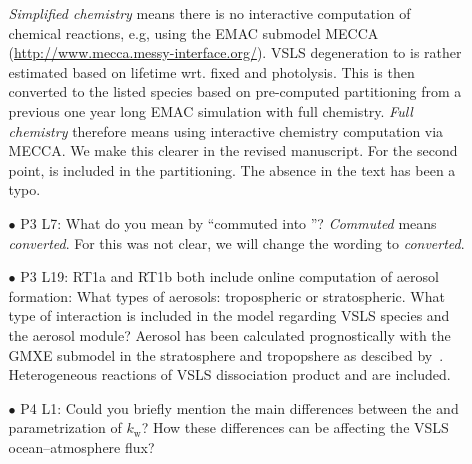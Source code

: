 \begin{itemize}
\begin{itemize}
  \emph{Simplified chemistry} means there is no interactive computation of chemical reactions, e.g, using the EMAC submodel MECCA (\url{http://www.mecca.messy-interface.org/}). VSLS degeneration to  is rather estimated based on lifetime wrt. fixed \chem{[OH]]} and photolysis. This  is then converted to the listed species based on pre-computed partitioning from a previous one year long EMAC simulation with full chemistry. \emph{Full chemistry} therefore means using interactive chemistry computation via MECCA. We make this clearer in the revised manuscript. For the second point,  is included in the partitioning. The absence in the text has been a typo.
\item[$\bullet$]{\color{blue}P3 L7: What do you mean by ``commuted into ''?}
  \emph{Commuted} means \emph{converted}. For this was not clear, we will change the wording to \emph{converted}.
\item[$\bullet$]{\color{blue}P3 L19: RT1a and RT1b both include online computation of aerosol formation: What types of aerosols: tropospheric or stratospheric. What type of interaction is included in the model regarding VSLS species and the aerosol module?}
  Aerosol has been calculated prognostically with the GMXE submodel in the stratosphere and tropopshere
as descibed by~\citet{ACP:Bruehl2012,JGR:Bruehl2015}. Heterogeneous reactions of VSLS dissociation product  and  are included.
\item[$\bullet$]{\color{blue}P4 L1: Could you briefly mention the main differences between the \citet{JGRC:Wanninkhof1992} and \citet{GRS:Nightingale2000} parametrization of $k_\mathrm{w}$? How these differences can be affecting the VSLS ocean--atmosphere flux?}

\end{itemize}
\end{itemize}

